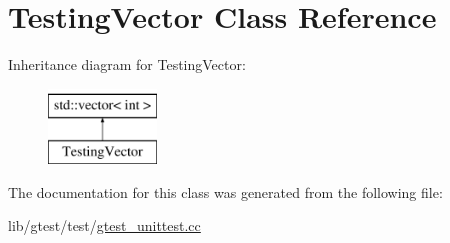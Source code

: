 \hypertarget{class_testing_vector}{\section{Testing\-Vector Class Reference}
\label{class_testing_vector}
}
Inheritance diagram for Testing\-Vector\-:\begin{figure}[H]
\begin{center}
\leavevmode
\includegraphics[height=2.000000cm]{class_testing_vector}
\end{center}
\end{figure}


The documentation for this class was generated from the following file\-:\begin{DoxyCompactItemize}
\item 
lib/gtest/test/\hyperlink{gtest__unittest_8cc}{gtest\-\_\-unittest.\-cc}\end{DoxyCompactItemize}
